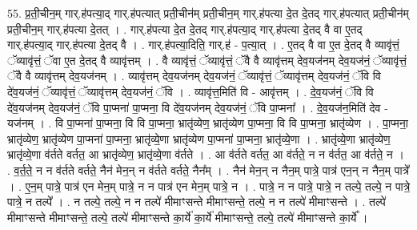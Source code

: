 \documentclass[17pt]{extarticle}
\begin{document}
55. प्र॒ती॒चीन॒म् गार्.ह॑पत्या॒द् गार्.ह॑पत्यात् प्रती॒चीन॑म् प्रती॒चीन॒म् गार्.ह॑पत्या दे॒त दे॒तद् गार्.ह॑पत्यात् प्रती॒चीन॑म् प्रती॒चीन॒म् गार्.ह॑पत्या दे॒तत् । . गार्.ह॑पत्या दे॒त दे॒तद् गार्.ह॑पत्या॒द् गार्.ह॑पत्या दे॒तद् वै वा ए॒तद् गार्.ह॑पत्या॒द् गार्.ह॑पत्या दे॒तद् वै । . गार्.ह॑पत्या॒दिति॒ गार्.ह॑ - प॒त्या॒त् । . ए॒तद् वै वा ए॒त दे॒तद् वै व्यावृ॑त्तं॒ ॅव्यावृ॑त्तं॒ ॅवा ए॒त दे॒तद् वै व्यावृ॑त्तम् । . वै व्यावृ॑त्तं॒ ॅव्यावृ॑त्तं॒ ॅवै वै व्यावृ॑त्तम् देव॒यज॑नम् देव॒यज॑नं॒ ॅव्यावृ॑त्तं॒ ॅवै वै व्यावृ॑त्तम् देव॒यज॑नम् । . व्यावृ॑त्तम् देव॒यज॑नम् देव॒यज॑नं॒ ॅव्यावृ॑त्तं॒ ॅव्यावृ॑त्तम् देव॒यज॑नं॒ ॅवि वि दे॑व॒यज॑नं॒ ॅव्यावृ॑त्तं॒ ॅव्यावृ॑त्तम् देव॒यज॑नं॒ ॅवि । . व्यावृ॑त्त॒मिति॑ वि - आवृ॑त्तम् । . दे॒व॒यज॑नं॒ ॅवि वि दे॑व॒यज॑नम् देव॒यज॑नं॒ ॅवि पा॒प्मना॑ पा॒प्मना॒ वि दे॑व॒यज॑नम् देव॒यज॑नं॒ ॅवि पा॒प्मना᳚ । . दे॒व॒यज॑न॒मिति॑ देव - यज॑नम् । . वि पा॒प्मना॑ पा॒प्मना॒ वि वि पा॒प्मना॒ भ्रातृ॑व्येण॒ भ्रातृ॑व्येण पा॒प्मना॒ वि वि पा॒प्मना॒ भ्रातृ॑व्येण । . पा॒प्मना॒ भ्रातृ॑व्येण॒ भ्रातृ॑व्येण पा॒प्मना॑ पा॒प्मना॒ भ्रातृ॑व्ये॒णा भ्रातृ॑व्येण पा॒प्मना॑ पा॒प्मना॒ भ्रातृ॑व्ये॒णा । . भ्रातृ॑व्ये॒णा भ्रातृ॑व्येण॒ भ्रातृ॑व्ये॒णा व॑र्तते वर्तत॒ आ भ्रातृ॑व्येण॒ भ्रातृ॑व्ये॒णा व॑र्तते । . आ व॑र्तते वर्तत॒ आ व॑र्तते॒ न न व॑र्तत॒ आ व॑र्तते॒ न । . व॒र्त॒ते॒ न न व॑र्तते वर्तते॒ नैन॑ मेन॒न् न व॑र्तते वर्तते॒ नैन᳚म् । . नैन॑ मेन॒न् न नैन॒म् पात्रे॒ पात्र॑ एन॒न् न नैन॒म् पात्रे᳚ । . ए॒न॒म् पात्रे॒ पात्र॑ एन मेन॒म् पात्रे॒ न न पात्र॑ एन मेन॒म् पात्रे॒ न । . पात्रे॒ न न पात्रे॒ पात्रे॒ न तल्पे॒ तल्पे॒ न पात्रे॒ पात्रे॒ न तल्पे᳚ । . न तल्पे॒ तल्पे॒ न न तल्पे॑ मीमाꣳसन्ते मीमाꣳसन्ते॒ तल्पे॒ न न तल्पे॑ मीमाꣳसन्ते । . तल्पे॑ मीमाꣳसन्ते मीमाꣳसन्ते॒ तल्पे॒ तल्पे॑ मीमाꣳसन्ते का॒र्ये॑ का॒र्ये॑ मीमाꣳसन्ते॒ तल्पे॒ तल्पे॑ मीमाꣳसन्ते का॒र्ये᳚ । \newline
\end{document}
